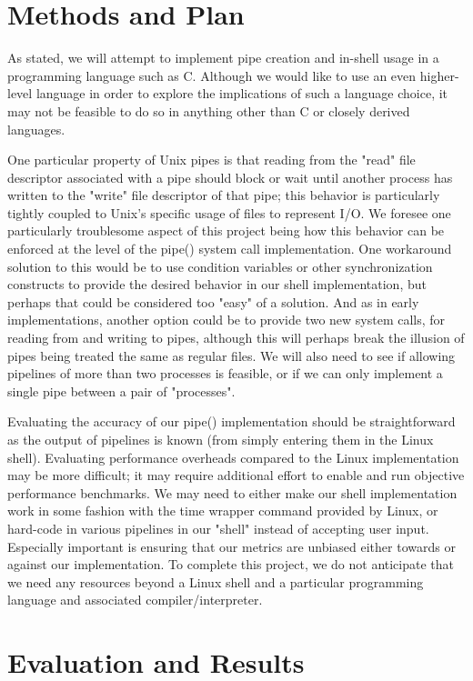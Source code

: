\section{Methods and Plan}

As stated, we will attempt to implement pipe creation and in-shell usage in a programming language such as C. Although we would like to use an even higher-level language in order to explore the implications of such a language choice, it may not be feasible to do so in anything other than C or closely derived languages. 

One particular property of Unix pipes is that reading from the "read" file descriptor associated with a pipe should block or wait until another process has written to the "write" file descriptor of that pipe; this behavior is particularly tightly coupled to Unix's specific usage of files to represent I/O. We foresee one particularly troublesome aspect of this project being how this behavior can be enforced at the level of the pipe() system call implementation. One workaround solution to this would be to use condition variables or other synchronization constructs to provide the desired behavior in our shell implementation, but perhaps that could be considered too "easy" of a solution. And as in early implementations, another option could be to provide two new system calls, for reading from and writing to pipes, although this will perhaps break the illusion of pipes being treated the same as regular files. We will also need to see if allowing pipelines of more than two processes is feasible, or if we can only implement a single pipe between a pair of "processes".

Evaluating the accuracy of our pipe() implementation should be straightforward as the output of pipelines is known (from simply entering them in the Linux shell).  Evaluating performance overheads compared to the Linux implementation may be more difficult; it may require additional effort to enable and run objective performance benchmarks. We may need to either make our shell implementation work in some fashion with the time wrapper command provided by Linux, or hard-code in various pipelines in our "shell" instead of accepting user input. Especially important is ensuring that our metrics are unbiased either towards or against our implementation.  To complete this project, we do not anticipate that we need any resources beyond a Linux shell and a particular programming language and associated compiler/interpreter.

\section{Evaluation and Results}

